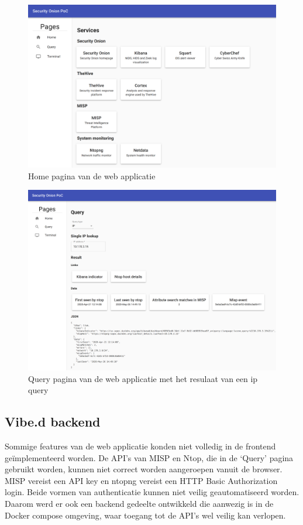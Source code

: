 \documentclass[a4paper, 12pt]{report}
\begin{document}
\begin{figure}[H]
  \centering
  \includegraphics[width=\textwidth]{so-manager-home}
  \caption{Home pagina van de web applicatie}
  \label{fig:so-manager-home}
\end{figure}

\begin{figure}[H]
  \centering
  \includegraphics[width=\textwidth]{so-manager-query}
  \caption{Query pagina van de web applicatie met het resulaat van een ip query}
  \label{fig:so-manager-query}
\end{figure}

\subsection{Vibe.d backend}
Sommige features van de web applicatie konden niet volledig in de frontend geïmplementeerd worden.
De API's van MISP en Ntop, die in de `Query' pagina gebruikt worden, kunnen niet correct worden aangeroepen vanuit de browser.
MISP vereist een API key en ntopng vereist een HTTP Basic Authorization login.
Beide vormen van authenticatie kunnen niet veilig geautomatiseerd worden.
Daarom werd er ook een backend gedeelte ontwikkeld die aanwezig is in de Docker compose omgeving, waar toegang tot de API's wel veilig kan verlopen.
\end{document}
